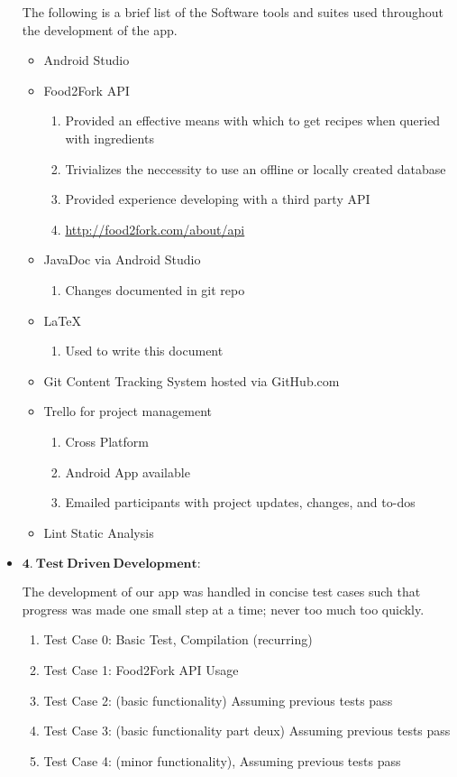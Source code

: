 \documentclass[a4paper,11pt]{article}
\begin{document}
\begin{itemize}
\parindent 30pt
The following is a brief list of the Software tools and suites used throughout the development of the app.
\begin{itemize}
\item Android Studio
\item Food2Fork API
	\begin{enumerate}
	\item Provided an effective means with which to get recipes when queried with ingredients
	\item Trivializes the neccessity to use an offline or locally created database
	\item Provided experience developing with a third party API
	\item \url{http://food2fork.com/about/api}
	\end{enumerate}
\item JavaDoc via Android Studio
	\begin{enumerate}
	\item Changes documented in git repo
	\end{enumerate}
\item LaTeX
	\begin{enumerate}
	\item Used to write this document
	\end{enumerate}
\item Git Content Tracking System hosted via GitHub.com
\item Trello for project management
	\begin{enumerate}
	\item Cross Platform
	\item Android App available
	\item Emailed participants with project updates, changes, and to-dos
	\end{enumerate}
\item Lint Static Analysis
\end{itemize}

\item $\mathbf{4.\ Test\ Driven\ Development:}$
\parindent 30pt

The development of our app was handled in concise test cases such that progress was made one small step at a time; never too much too quickly. \
\begin{enumerate}
\item Test Case 0: Basic Test, Compilation (recurring)
\item Test Case 1: Food2Fork API Usage
\item Test Case 2: (basic functionality) Assuming previous tests pass
\item Test Case 3: (basic functionality part deux) Assuming previous tests pass
\item Test Case 4: (minor functionality), Assuming previous tests pass
\end{enumerate}


\end{itemize}
\end{document}
